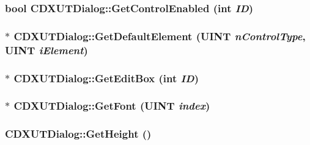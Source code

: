 \label{class_c_d_x_u_t_dialog_a8d1c613d40be521ed5307446e33196e1}
\hypertarget{class_c_d_x_u_t_dialog_a274fa05f0de8b86856434f1f1a93409e}{
\subsubsection[{GetControlEnabled}]{\setlength{\rightskip}{0pt plus 5cm}bool CDXUTDialog::GetControlEnabled ({\bf int} {\em ID})}}
\label{class_c_d_x_u_t_dialog_a274fa05f0de8b86856434f1f1a93409e}
\hypertarget{class_c_d_x_u_t_dialog_ac77892923ec7d9b8838b745c3937e8db}{
\subsubsection[{GetDefaultElement}]{ $\ast$ CDXUTDialog::GetDefaultElement (UINT {\em nControlType}, \/  UINT {\em iElement})}}
\label{class_c_d_x_u_t_dialog_ac77892923ec7d9b8838b745c3937e8db}
\hypertarget{class_c_d_x_u_t_dialog_ad0e0333dfd921e371b1cfaf4aec674fe}{
\subsubsection[{GetEditBox}]{$\ast$ CDXUTDialog::GetEditBox ({\bf int} {\em ID})}}
\label{class_c_d_x_u_t_dialog_ad0e0333dfd921e371b1cfaf4aec674fe}
\hypertarget{class_c_d_x_u_t_dialog_abbd6628848668c6f4af3d10fac4411f3}{
\subsubsection[{GetFont}]{ $\ast$ CDXUTDialog::GetFont (UINT {\em index})}}
\label{class_c_d_x_u_t_dialog_abbd6628848668c6f4af3d10fac4411f3}
\hypertarget{class_c_d_x_u_t_dialog_ae6cae46633b8133c0447dcc0e9ae2bdf}{
\subsubsection[{GetHeight}]{ CDXUTDialog::GetHeight ()}}
